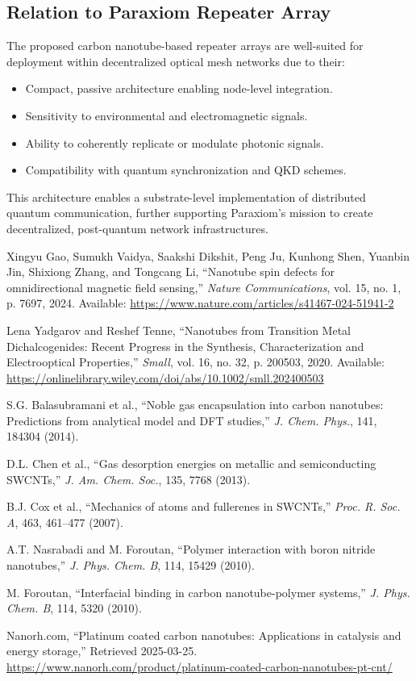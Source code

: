 \documentclass[11pt]{article}
\begin{document}
	\subsection*{Relation to Paraxiom Repeater Array}
	The proposed carbon nanotube-based repeater arrays are well-suited for deployment within decentralized optical mesh networks due to their:
	\begin{itemize}
		\item Compact, passive architecture enabling node-level integration.
		\item Sensitivity to environmental and electromagnetic signals.
		\item Ability to coherently replicate or modulate photonic signals.
		\item Compatibility with quantum synchronization and QKD schemes.
	\end{itemize}
	
	This architecture enables a substrate-level implementation of distributed quantum communication, further supporting Paraxiom's mission to create decentralized, post-quantum network infrastructures.
	
	\begin{thebibliography}{99}
		
		Xingyu Gao, Sumukh Vaidya, Saakshi Dikshit, Peng Ju, Kunhong Shen, Yuanbin Jin, Shixiong Zhang, and Tongcang Li, ``Nanotube spin defects for omnidirectional magnetic field sensing,'' \textit{Nature Communications}, vol. 15, no. 1, p. 7697, 2024. Available: \url{https://www.nature.com/articles/s41467-024-51941-2}
		
		Lena Yadgarov and Reshef Tenne, ``Nanotubes from Transition Metal Dichalcogenides: Recent Progress in the Synthesis, Characterization and Electrooptical Properties,'' \textit{Small}, vol. 16, no. 32, p. 200503, 2020. Available: \url{https://onlinelibrary.wiley.com/doi/abs/10.1002/smll.202400503}
		
		S.G. Balasubramani et al., ``Noble gas encapsulation into carbon nanotubes: Predictions from analytical model and DFT studies,'' \textit{J. Chem. Phys.}, 141, 184304 (2014).
		
		D.L. Chen et al., ``Gas desorption energies on metallic and semiconducting SWCNTs,'' \textit{J. Am. Chem. Soc.}, 135, 7768 (2013).
		
		B.J. Cox et al., ``Mechanics of atoms and fullerenes in SWCNTs,'' \textit{Proc. R. Soc. A}, 463, 461--477 (2007).
		
		A.T. Nasrabadi and M. Foroutan, ``Polymer interaction with boron nitride nanotubes,'' \textit{J. Phys. Chem. B}, 114, 15429 (2010).
		
		M. Foroutan, ``Interfacial binding in carbon nanotube-polymer systems,'' \textit{J. Phys. Chem. B}, 114, 5320 (2010).
		
		Nanorh.com, ``Platinum coated carbon nanotubes: Applications in catalysis and energy storage,'' Retrieved 2025-03-25. \url{https://www.nanorh.com/product/platinum-coated-carbon-nanotubes-pt-cnt/}
		
	\end{thebibliography}
	
\end{document}
